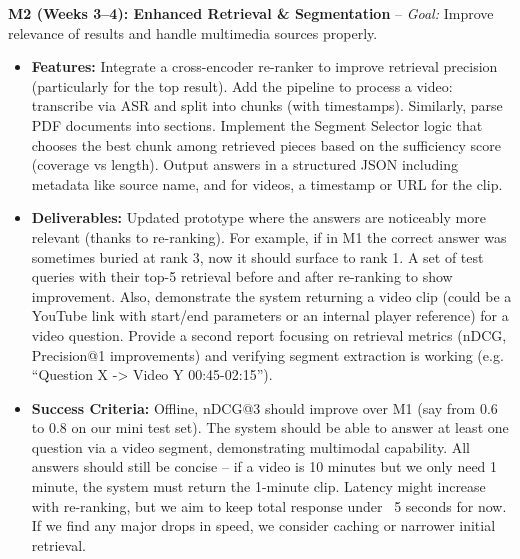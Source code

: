 \documentclass[11pt]{article}
\begin{document}
\textbf{M2 (Weeks 3–4): Enhanced Retrieval \& Segmentation} – \textit{Goal:} Improve relevance of results and handle multimedia sources properly.
  \begin{itemize}
    \item \textbf{Features:} Integrate a cross-encoder re-ranker to improve retrieval precision (particularly for the top result). Add the pipeline to process a video: transcribe via ASR and split into chunks (with timestamps). Similarly, parse PDF documents into sections. Implement the Segment Selector logic that chooses the best chunk among retrieved pieces based on the sufficiency score (coverage vs length). Output answers in a structured JSON including metadata like source name, and for videos, a timestamp or URL for the clip.
    \item \textbf{Deliverables:} Updated prototype where the answers are noticeably more relevant (thanks to re-ranking). For example, if in M1 the correct answer was sometimes buried at rank 3, now it should surface to rank 1. A set of test queries with their top-5 retrieval before and after re-ranking to show improvement. Also, demonstrate the system returning a video clip (could be a YouTube link with start/end parameters or an internal player reference) for a video question. Provide a second report focusing on retrieval metrics (nDCG, Precision@1 improvements) and verifying segment extraction is working (e.g. “Question X -> Video Y 00:45-02:15”).
    \item \textbf{Success Criteria:} Offline, nDCG@3 should improve over M1 (say from 0.6 to 0.8 on our mini test set). The system should be able to answer at least one question via a video segment, demonstrating multimodal capability. All answers should still be concise – if a video is 10 minutes but we only need 1 minute, the system must return the 1-minute clip. Latency might increase with re-ranking, but we aim to keep total response under ~5 seconds for now. If we find any major drops in speed, we consider caching or narrower initial retrieval.
  \end{itemize}
\end{document}
